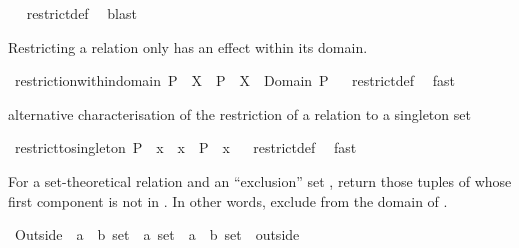 \begin{isabellebody}
\isadelimproof
\ %
\endisadelimproof
%
\isatagproof
{}\isamarkupfalse%
\ restrict{\isacharunderscore}def\ \isamarkupfalse%
\ blast%
\endisatagproof
{\isafoldproof}%
%
\isadelimproof
%
\endisadelimproof
%
\begin{isamarkuptext}%
Restricting a relation only has an effect within its domain.%
\end{isamarkuptext}%
\isamarkuptrue%
\isamarkupfalse%
\ restriction{\isacharunderscore}within{\isacharunderscore}domain{\isacharcolon}\ {\isachardoublequoteopen}P\ {\isacharbar}{\isacharbar}\ X\ {\isacharequal}\ P\ {\isacharbar}{\isacharbar}\ {\isacharparenleft}X\ {\isasyminter}\ {\isacharparenleft}Domain\ P{\isacharparenright}{\isacharparenright}{\isachardoublequoteclose}%
\isadelimproof
\ %
\endisadelimproof
%
\isatagproof
{}\isamarkupfalse%
\ restrict{\isacharunderscore}def\ \isamarkupfalse%
\ fast%
\endisatagproof
{\isafoldproof}%
%
\isadelimproof
%
\endisadelimproof
%
\begin{isamarkuptext}%
alternative characterisation of the restriction of a relation to a singleton set%
\end{isamarkuptext}%
\isamarkuptrue%
\isamarkupfalse%
\ restrict{\isacharunderscore}to{\isacharunderscore}singleton{\isacharcolon}\ {\isachardoublequoteopen}P\ {\isacharbar}{\isacharbar}\ {\isacharbraceleft}x{\isacharbraceright}\ {\isacharequal}\ {\isacharbraceleft}x{\isacharbraceright}\ {\isasymtimes}\ P\ {\isacharbackquote}{\isacharbackquote}\ {\isacharbraceleft}x{\isacharbraceright}{\isachardoublequoteclose}%
\isadelimproof
\ %
\endisadelimproof
%
\isatagproof
{}\isamarkupfalse%
\ restrict{\isacharunderscore}def\ \isamarkupfalse%
\ fast%
\endisatagproof
{\isafoldproof}%
%
\isadelimproof
%
\endisadelimproof
%
\isamarkuptrue%
%
\begin{isamarkuptext}%
For a set-theoretical relation  and an ``exclusion'' set , return those
  tuples of  whose first component is not in .  In other words, exclude 
  from the domain of .%
\end{isamarkuptext}%
\isamarkuptrue%
\isamarkupfalse%
\ Outside\ {\isacharcolon}{\isacharcolon}\ {\isachardoublequoteopen}{\isacharparenleft}{\isacharprime}a\ {\isasymtimes}\ {\isacharprime}b{\isacharparenright}\ set\ {\isasymRightarrow}\ {\isacharprime}a\ set\ {\isasymRightarrow}\ {\isacharparenleft}{\isacharprime}a\ {\isasymtimes}\ {\isacharprime}b{\isacharparenright}\ set{\isachardoublequoteclose}\ {\isacharparenleft}\ {\isachardoublequoteopen}outside{\isachardoublequoteclose}\ {}{}{\isacharparenright}\ \isanewline

\end{isabellebody}
